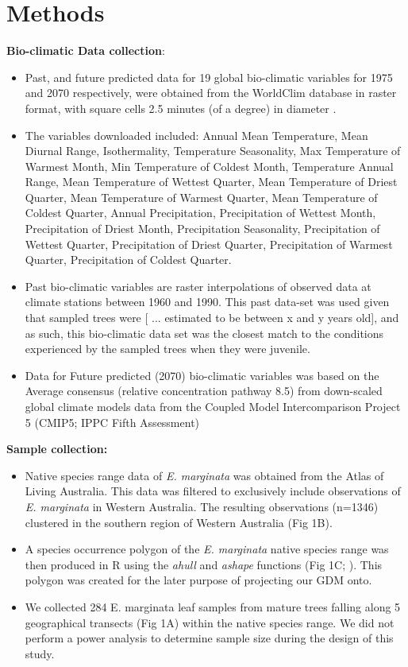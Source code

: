\section*{Methods}

\textbf{Bio-climatic Data collection}:
\begin{itemize}
\item Past, and future predicted data for 19 global bio-climatic variables for 1975 and 2070 respectively, were obtained from the WorldClim database in raster format, with square cells 2.5 minutes (of a degree) in diameter \cite{}.
\item The variables downloaded included: Annual Mean Temperature, Mean Diurnal Range, Isothermality, Temperature Seasonality, Max Temperature of Warmest Month, Min Temperature of Coldest Month, Temperature Annual Range, Mean Temperature of Wettest Quarter, Mean Temperature of Driest Quarter, Mean Temperature of Warmest Quarter, Mean Temperature of Coldest Quarter, Annual Precipitation, Precipitation of Wettest Month, Precipitation of Driest Month, Precipitation Seasonality, Precipitation of Wettest Quarter, Precipitation of Driest Quarter, Precipitation of Warmest Quarter, Precipitation of Coldest Quarter.
\item Past bio-climatic variables are raster interpolations of observed data at climate stations between 1960 and 1990. This past data-set was used given that sampled trees were [ ... estimated to be between x and y years old], and as such, this bio-climatic data set was the closest match to the conditions experienced by the sampled trees when they were juvenile.
\item Data for Future predicted (2070) bio-climatic variables was based on the Average consensus (relative concentration pathway 8.5) from down-scaled global climate models data from the Coupled Model Intercomparison Project 5 (CMIP5; IPPC Fifth Assessment)
\end{itemize}

\textbf{Sample collection:}
\begin{itemize}
\item Native species range data of \textit{E. marginata} was obtained from the Atlas of Living Australia. This data was filtered to exclusively include observations of \textit{E. marginata} in Western Australia. The resulting observations (n=1346) clustered in the southern region of Western Australia (Fig 1B).
\item A species occurrence polygon of the \textit{E. marginata} native species range was then produced in R using the \textit{ahull} and \textit{ashape} functions (Fig 1C; \cite{Pateiro-Lopez2010}). This polygon was created for the later purpose of projecting our GDM onto.
\item We collected 284 E. marginata leaf samples from mature trees falling along 5 geographical transects (Fig 1A) within the native species range. We did not perform a power analysis to determine sample size during the design of this study.
\end{itemize}


